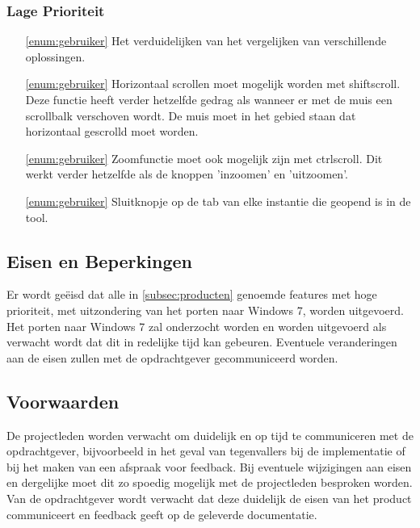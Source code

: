 \subsubsection*{Lage Prioriteit}
\begin{itemize}
	\item[\ref{enum:gebruiker}] Het verduidelijken van het vergelijken van verschillende oplossingen.
	\item[\ref{enum:gebruiker}] Horizontaal scrollen moet mogelijk worden met shift\plus scroll. Deze functie heeft verder hetzelfde gedrag als wanneer er met de muis een scrollbalk verschoven wordt. De muis moet in het gebied staan dat horizontaal gescrolld moet worden. 
	\item[\ref{enum:gebruiker}] Zoomfunctie moet ook mogelijk zijn met ctrl\plus scroll. Dit werkt verder hetzelfde als de knoppen 'inzoomen' en 'uitzoomen'.
	\item[\ref{enum:gebruiker}] Sluitknopje op de tab van elke instantie die geopend is in de tool.
\end{itemize}

\subsection{Eisen en Beperkingen}
Er wordt ge\"eisd dat alle in \ref{subsec:producten} genoemde features met hoge prioriteit, met uitzondering van het porten naar Windows 7, worden uitgevoerd. Het porten naar Windows 7 zal onderzocht worden en worden uitgevoerd als verwacht wordt dat dit in redelijke tijd kan gebeuren. Eventuele veranderingen aan de eisen zullen met de opdrachtgever gecommuniceerd worden.

\subsection{Voorwaarden}
De projectleden worden verwacht om duidelijk en op tijd te communiceren met de opdrachtgever, bijvoorbeeld in het geval van tegenvallers bij de implementatie of bij het maken van een afspraak voor feedback. Bij eventuele wijzigingen aan eisen en dergelijke moet dit zo spoedig mogelijk met de projectleden besproken worden. Van de opdrachtgever wordt verwacht dat deze duidelijk de eisen van het product communiceert en feedback geeft op de geleverde documentatie.
